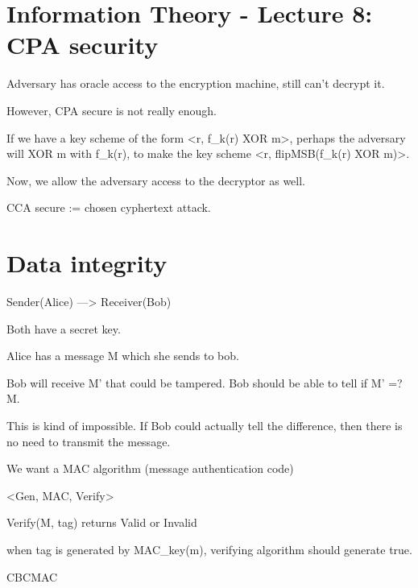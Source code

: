 \section{Information Theory - Lecture 8: CPA security}

Adversary has oracle access to the encryption machine, still can't decrypt it.

However, CPA secure is not really enough.


If we have a key scheme of the form <r, f_k(r) XOR m>, perhaps the adversary will
XOR m with f_k(r), to make the key scheme <r, flipMSB(f_k(r) XOR m)>.



Now, we allow the adversary access to the decryptor as well.

CCA secure := chosen cyphertext attack.


\section{Data integrity}

Sender(Alice) ---> Receiver(Bob)

Both have a secret key.

Alice has a message M which she sends to bob.

Bob will receive M' that could be tampered. Bob should be able to tell
if M' =? M.

This is kind of impossible. If Bob could actually tell the difference,
then there is no need to transmit the message.


We want a MAC algorithm (message authentication code)


<Gen, MAC, Verify>

Verify(M, tag) returns Valid or Invalid

when tag is generated by MAC_key(m), verifying algorithm should generate true.


CBCMAC
